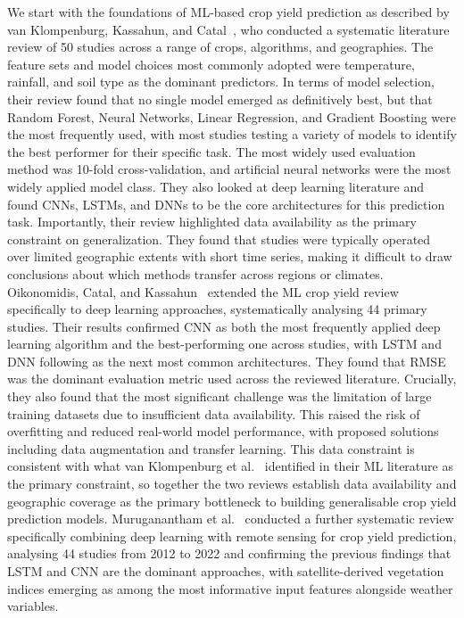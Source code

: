 \documentclass[pdflatex,sn-mathphys-num, oneside]{sn-jnl}%
\theoremstyle{thmstyleone}%
\theoremstyle{thmstyletwo}%
\theoremstyle{thmstylethree}%
\begin{document}
We start with the foundations of ML-based crop yield prediction as described by van Klompenburg, Kassahun, and Catal~\cite{bib14}, who conducted a systematic literature review of 50 studies across a range of crops, algorithms, and geographies. The feature sets and model choices most commonly adopted were temperature, rainfall, and soil type as the dominant predictors. In terms of model selection, their review found that no single model emerged as definitively best, but that Random Forest, Neural Networks, Linear Regression, and Gradient Boosting were the most frequently used, with most studies testing a variety of models to identify the best performer for their specific task. The most widely used evaluation method was 10-fold cross-validation, and artificial neural networks were the most widely applied model class. They also looked at deep learning literature and found CNNs, LSTMs, and DNNs to be the core architectures for this prediction task. Importantly, their review highlighted data availability as the primary constraint on generalization. They found that studies were typically operated over limited geographic extents with short time series, making it difficult to draw conclusions about which methods transfer across regions or climates. Oikonomidis, Catal, and Kassahun~\cite{bib15} extended the ML crop yield review specifically to deep learning approaches, systematically analysing 44 primary studies. Their results confirmed CNN as both the most frequently applied deep learning algorithm and the best-performing one across studies, with LSTM and DNN following as the next most common architectures. They found that RMSE was the dominant evaluation metric used across the reviewed literature. Crucially, they also found that the most significant challenge was the limitation of large training datasets due to insufficient data availability. This raised the risk of overfitting and reduced real-world model performance, with proposed solutions including data augmentation and transfer learning. This data constraint is consistent with what van Klompenburg et al.~\cite{bib14} identified in their ML literature as the primary constraint, so together the two reviews establish data availability and geographic coverage as the primary bottleneck to building generalisable crop yield prediction models. Muruganantham et al.~\cite{bib20} conducted a further systematic review specifically combining deep learning with remote sensing for crop yield prediction, analysing 44 studies from 2012 to 2022 and confirming the previous findings that LSTM and CNN are the dominant approaches, with satellite-derived vegetation indices emerging as among the most informative input features alongside weather variables.
 
\end{document}
